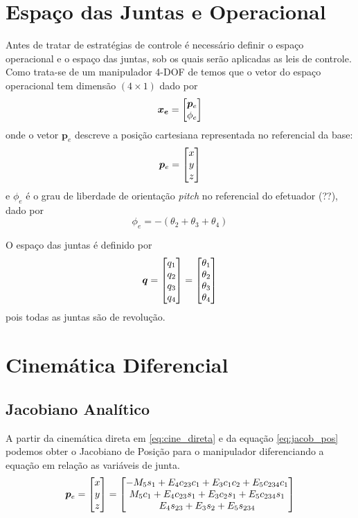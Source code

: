 \section{Espaço das Juntas e Operacional}
Antes de tratar de estratégias de controle é necessário definir o espaço operacional e o espaço das juntas,  sob os quais serão aplicadas as leis de controle. 
Como trata-se de um manipulador 4-DOF de temos que o vetor do espaço operacional tem dimensão $(4 \times 1)$ dado por 
\begin{equation} \label{eq:operational_space}
\bm{x_e} = \begin{bmatrix}\bm{p}_e \\ \phi_e\end{bmatrix}
\end{equation}
onde o vetor $\bm{p}_e$ descreve a posição cartesiana representada no referencial da base:
\begin{equation}
\bm{p}_e = \begin{bmatrix}x \\ y \\ z\end{bmatrix}
\end{equation}
e $\phi_e$ é o grau de liberdade de orientação \textit{pitch} no referencial do efetuador (??), dado por
\begin{equation} \label{eq:orientacao}
\phi_e = -(\theta_2 + \theta_3 + \theta_4)
\end{equation}

O espaço das juntas é definido por 
\begin{equation} \label{joint_space}
\bm{q} = \begin{bmatrix}q_1 \\ q_2 \\ q_3 \\ q_4\end{bmatrix} = \begin{bmatrix}\theta_1 \\ \theta_2 \\ \theta_3 \\ \theta_4  \end{bmatrix}
\end{equation} 
pois todas as juntas são de revolução.

\section{Cinemática Diferencial}

\subsection{Jacobiano Analítico}
A partir da cinemática direta em \eqref{eq:cine_direta} e da equação \ref{eq:jacob_pos} podemos obter o Jacobiano de Posição para o manipulador diferenciando a equação em relação as variáveis de junta. 
\begin{equation}
\bm{p}_e = \begin{bmatrix}x \\ y \\ z\end{bmatrix} =
\begin{bmatrix}
   -M_5 s_1 + E_4 c_{23}c_1 + E_3 c_1 c_2 + E_5 c_{234} c_1 \\
     M_5 c_1+E_4 c_{23} s_1 + E_3 c_2 s_1 + E_5 c_{234} s_1 \\
   						 E_4 s_{23} + E_3 s_2 + E_5 s_{234} \\
\end{bmatrix}
\end{equation}

